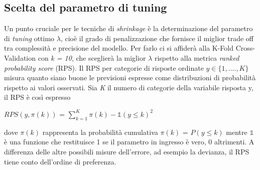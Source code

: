 
\subsection{Scelta del parametro di tuning}
Un punto cruciale per le tecniche di \emph{shrinkage} è la determinazione del parametro di \emph{tuning} ottimo $\lambda$, cioè il grado di penalizzazione che fornisce il miglior trade off tra complessità e precisione del modello. Per farlo ci si affiderà alla K-Fold Cross-Validation con \emph{k = 10}, che sceglierà la miglior $\lambda$ rispetto alla metrica \emph{ranked probability score} (RPS). Il RPS \autocite{gneiting2007strictly} per categorie di risposte ordinate $y \in \{1,....,K\}$  misura quanto siano buone le previsioni espresse come distribuzioni di probabilità rispetto ai valori osservati.
Sia \emph{K} il numero di categorie della variabile risposta y, il RPS è così espresso 
\begin{center}
	$ RPS(y,\pi(k))$ = $\sum^{K}_{k = 1}{\pi(k) -  \mathds{1} (y \le k)}^2$ 
\end{center}
dove $\pi(k)$ rappresenta la probabilità cumulativa $\pi(k)$ = $P(y \le k)$ mentre $\mathds{1}$ è una funzione che restituisce 1 se il parametro in ingresso è vero, 0 altrimenti. A differenza delle altre possibili misure dell'errore, ad esempio la devianza, il RPS tiene conto dell'ordine di preferenza.




